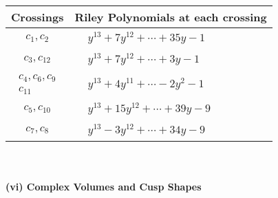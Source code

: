 \documentclass[1p]{elsarticle_modified}
\theoremstyle{definition}
\begin{document}
\begin{tabular}{m{50pt}|m{274pt}}
Crossings & \hspace{64pt}Riley Polynomials at each crossing \\
\hline $$\begin{aligned}c_{1},c_{2}\end{aligned}$$&$\begin{aligned}
&y^{13}+7 y^{12}+\cdots+35 y-1
\end{aligned}$\\
\hline $$\begin{aligned}c_{3},c_{12}\end{aligned}$$&$\begin{aligned}
&y^{13}+7 y^{12}+\cdots+3 y-1
\end{aligned}$\\
\hline $$\begin{aligned}c_{4},c_{6},c_{9}\\c_{11}\end{aligned}$$&$\begin{aligned}
&y^{13}+4 y^{11}+\cdots-2 y^2-1
\end{aligned}$\\
\hline $$\begin{aligned}c_{5},c_{10}\end{aligned}$$&$\begin{aligned}
&y^{13}+15 y^{12}+\cdots+39 y-9
\end{aligned}$\\
\hline $$\begin{aligned}c_{7},c_{8}\end{aligned}$$&$\begin{aligned}
&y^{13}-3 y^{12}+\cdots+34 y-9
\end{aligned}$\\
\hline
\end{tabular}\\~\\
\newpage\flushleft \textbf{(vi) Complex Volumes and Cusp Shapes}
\end{document}
